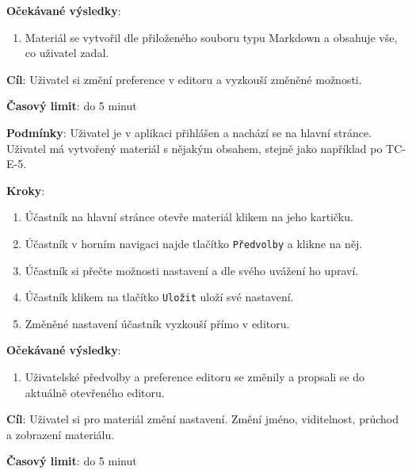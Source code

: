 \textbf{Očekávané výsledky}:

\begin{enumerate}[leftmargin=1.4cm]
    \item Materiál se vytvořil dle přiloženého souboru typu Markdown a obsahuje vše, co uživatel zadal.
\end{enumerate}





\vspace{1em}

\textbf{Cíl}: Uživatel si změní preference v editoru a vyzkouší změněné možnosti.

\textbf{Časový limit}: do 5 minut

\textbf{Podmínky}:  Uživatel je v aplikaci přihlášen a nachází se na hlavní stránce.  Uživatel má vytvořený materiál s nějakým obsahem, stejně jako například po TC-E-5.

\textbf{Kroky}:

\begin{enumerate}[leftmargin=1.4cm]
    \item Účastník na hlavní stránce otevře materiál klikem na jeho kartičku.
    \item Účastník v horním navigaci najde tlačítko \verb|Předvolby| a klikne na něj.
    \item Účastník si přečte možnosti nastavení a dle svého uvážení ho upraví. 
    \item Účastník klikem na tlačítko \verb|Uložit| uloží své nastavení.
    \item Změněné nastavení účastník vyzkouší přímo v editoru.
\end{enumerate}

\textbf{Očekávané výsledky}:

\begin{enumerate}[leftmargin=1.4cm]
    \item Uživatelské předvolby a preference editoru se změnily a propsali se do aktuálně otevřeného editoru. 
\end{enumerate}




\vspace{1em}

\textbf{Cíl}: Uživatel si pro materiál změní nastavení. Změní jméno, viditelnost, průchod a zobrazení materiálu.

\textbf{Časový limit}: do 5 minut

